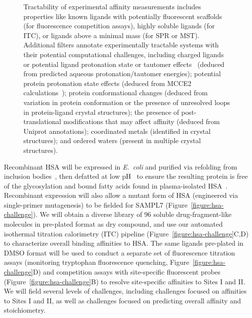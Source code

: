 \documentclass[11pt]{article}
\begin{document}
\begin{figure}
{Tractability of experimental affinity measurements includes properties like known ligands with potentially fluorescent scaffolds (for fluorescence competition assays), highly soluble ligands (for ITC), or ligands above a minimal mass (for SPR or MST).
Additional filters annotate experimentally tractable systems with their potential computational challenges, including charged ligands or potential ligand protonation state or tautomer effects~\cite{Martin:2009:JournalofComputer-AidedMolecularDesign} (deduced from predicted aqueous protonation/tautomer energies); potential protein protonation state effects (deduced from MCCE2 calculations~\cite{Song:2009:JournalofComputationalChemistry}); protein conformational changes (deduced from variation in protein conformation or the presence of unresolved loops in protein-ligand crystal structures); the presence of post-translational modifications that may affect affinity (deduced from Uniprot annotations); coordinated metals (identified in crystal structures); and ordered waters (present in multiple crystal structures).
}
\end{figure}

Recombinant HSA will be expressed in \emph{E.~coli} and purified via refolding from inclusion bodies~\cite{Latta:1987:Bio/Technology}, then defatted at low pH~\cite{Lang:2015:BiotechnologyProgress} to ensure the resulting protein is free of the glycosylation and bound fatty acids found in plasma-isolated HSA~\cite{Lang:2015:BiotechnologyProgress}.
Recombinant expression will also allow a mutant form of HSA (engineered via single-primer mutagenesis) to be fielded for SAMPL7 (Figure~\ref{figure:hsa-challenge}).
We will obtain a diverse library of 96 soluble drug-fragment-like molecules in pre-plated format as dry compound, and use our automated isothermal titration calorimetry (ITC) pipeline (Figure~\ref{figure:hsa-challenge}C,D) to characterize overall binding affinities to HSA.
The same ligands pre-plated in DMSO format will be used to conduct a separate set of fluorescence titration assays (monitoring tryptophan fluorescence quenching, Figure~\ref{figure:hsa-challenge}D) and competition assays with site-specific fluorescent probes (Figure~\ref{figure:hsa-challenge}B) to resolve site-specific affinities to Sites I and II.
We will field several levels of challenges, including challenges focused on affinities to Sites I and II, as well as challenges focused on predicting overall affinity and stoichiometry.
\end{document}
